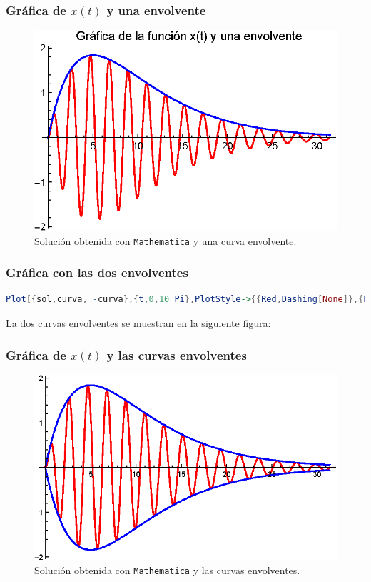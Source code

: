 \begin{frame}
\frametitle{Gráfica de $x(t)$ y una envolvente}
\begin{figure}[H]
    \centering
    \includegraphics[scale=1]{Imagenes/Ejemplo_Resonancia_03.eps}
    \caption{Solución obtenida con \texttt{Mathematica} y una curva envolvente.}
\end{figure}
\end{frame}
\begin{frame}[fragile]
\frametitle{Gráfica con las dos envolventes}
\begin{lstlisting}[language=Mathematica]
Plot[{sol,curva, -curva},{t,0,10 Pi},PlotStyle->{{Red,Dashing[None]},{Blue,Dashing[None]}, {Blue,Dashing[None]}}]
\end{lstlisting}
La dos curvas envolventes se muestran en la siguiente figura:
\end{frame}
\begin{frame}
\frametitle{Gráfica de $x(t)$ y las curvas envolventes}
\begin{figure}[H]
    \centering
    \includegraphics[scale=1]{Imagenes/Ejemplo_Resonancia_04.eps}
    \caption{Solución obtenida con \texttt{Mathematica} y las curvas envolventes.}
\end{figure}
\end{frame}
